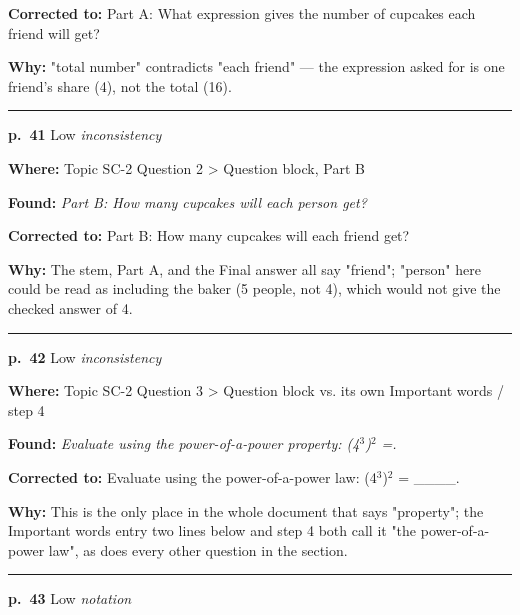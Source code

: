 \documentclass[11pt]{article}
\newcommand{\sevlow}[1]{\textcolor{black!55}{#1}}
\begin{document}
\noindent\textbf{Corrected to: }Part A: What expression gives the number of cupcakes each friend will get?\par
\noindent\textbf{Why: }"total number" contradicts "each friend" --- the expression asked for is one friend's share (4), not the total (16).\par\vspace{4pt}
\noindent\rule{\textwidth}{0.4pt}\par\nobreak\vspace{2pt}
\noindent\textbf{p.~41} \quad \sevlow{Low} \quad \textit{inconsistency}\par
\noindent\textbf{Where: }Topic SC-2 Question 2 > Question block, Part B\par
\noindent\textbf{Found: }\textit{Part B: How many cupcakes will each person get?}\par
\noindent\textbf{Corrected to: }Part B: How many cupcakes will each friend get?\par
\noindent\textbf{Why: }The stem, Part A, and the Final answer all say "friend"; "person" here could be read as including the baker (5 people, not 4), which would not give the checked answer of 4.\par\vspace{4pt}
\noindent\rule{\textwidth}{0.4pt}\par\nobreak\vspace{2pt}
\noindent\textbf{p.~42} \quad \sevlow{Low} \quad \textit{inconsistency}\par
\noindent\textbf{Where: }Topic SC-2 Question 3 > Question block vs. its own Important words / step 4\par
\noindent\textbf{Found: }\textit{Evaluate using the power-of-a-power property: (4$^3$)$^2$ =.}\par
\noindent\textbf{Corrected to: }Evaluate using the power-of-a-power law: (4$^3$)$^2$ = \_\_\_\_.\par
\noindent\textbf{Why: }This is the only place in the whole document that says "property"; the Important words entry two lines below and step 4 both call it "the power-of-a-power law", as does every other question in the section.\par\vspace{4pt}
\noindent\rule{\textwidth}{0.4pt}\par\nobreak\vspace{2pt}
\noindent\textbf{p.~43} \quad \sevlow{Low} \quad \textit{notation}\par
\end{document}
